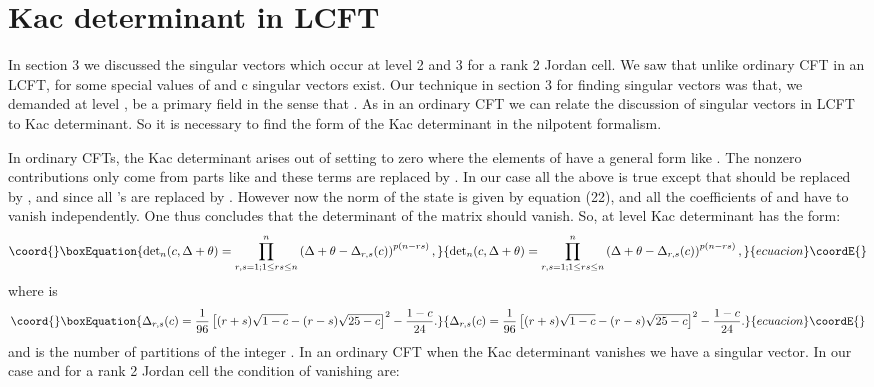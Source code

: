 \documentclass[a4paper,11pt]{article}
\begin{document}
\section{Kac determinant in LCFT}
In section 3 we discussed the singular vectors which occur at
level 2 and 3 for a rank 2 Jordan cell. We saw that unlike
ordinary CFT in an LCFT, for some special values of \myHighlight{$\Delta$}\coordHE{} and
c singular vectors exist. Our technique in section 3 for finding
singular vectors was that, we demanded at level \coordHE{},
\coordHE{} be a primary field in the
sense that \coordHE{}. As in an ordinary CFT we
can relate the discussion of singular vectors in LCFT to Kac
determinant. So it is necessary to find the form of the Kac
determinant in the nilpotent \myHighlight{$\theta$}\coordHE{} formalism.

In ordinary CFTs, the Kac determinant arises out of setting
\coordHE{} to zero where the elements of \coordHE{}
have a general form like \coordHE{}. The nonzero
contributions only come from parts like \coordHE{} and these terms
are replaced by \coordHE{}.
In our case all the above is true except that \myHighlight{$|\Delta\rangle$}\coordHE{}
should be replaced by \myHighlight{$|\Delta + \theta\rangle$}\coordHE{}, and since
\coordHE{} all \myHighlight{$\Delta$}\coordHE{}'s are replaced by \myHighlight{$\Delta + \theta$}\coordHE{}.
However now the norm of the state \myHighlight{$|\Delta + \theta\rangle$}\coordHE{} is
given by equation (22), and all the coefficients of \myHighlight{$\theta$}\coordHE{} and
\myHighlight{$\bar{\theta}$}\coordHE{} have to vanish independently. One thus concludes
that the determinant of the matrix \coordHE{} should vanish. So, at
level \coordHE{} Kac determinant has the form:
\begin{equation}\coord{}\boxEquation{
{\det}_{n}(c,\Delta+\theta)=\prod_{r,s=1;1 \leq r s\leq
n}^{n}\left(\Delta+\theta-\Delta_{r,s}(c)\right)^{p(n-rs)} ,
}{
{\det}_{n}(c,\Delta+\theta)=\prod_{r,s=1;1 \leq r s\leq
n}^{n}\left(\Delta+\theta-\Delta_{r,s}(c)\right)^{p(n-rs)} ,
}{ecuacion}\coordE{}\end{equation}
where \coordHE{} is
\begin{equation}\coord{}\boxEquation{
\Delta_{r,s}(c)=
\frac{1}{96}\left[(r+s)\sqrt{1-c}-(r-s)\sqrt{25-c}\right]^{2}
-\frac{1-c}{24} .
}{
\Delta_{r,s}(c)=
\frac{1}{96}\left[(r+s)\sqrt{1-c}-(r-s)\sqrt{25-c}\right]^{2}
-\frac{1-c}{24} .
}{ecuacion}\coordE{}\end{equation}
and \coordHE{} is the number of partitions of the integer \coordHE{}.
In an ordinary CFT when the Kac determinant vanishes we have a
singular vector. In our case and for a rank 2 Jordan cell the
condition of vanishing \coordHE{} are:
\end{document}
